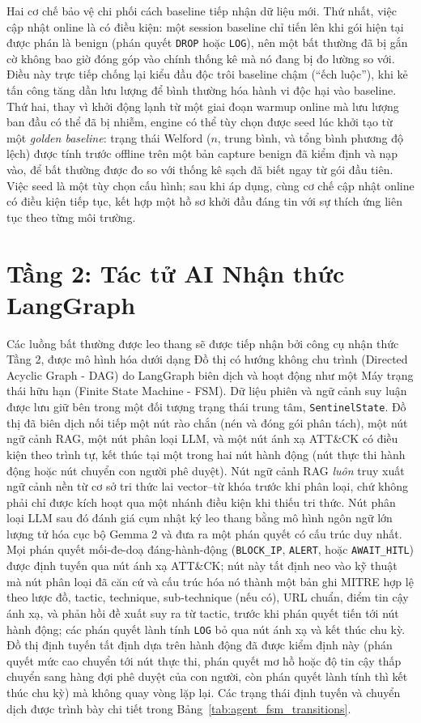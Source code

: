 Hai cơ chế bảo vệ chi phối cách baseline tiếp nhận dữ liệu mới. Thứ nhất, việc cập nhật online là có điều kiện: một session baseline chỉ tiến lên khi gói hiện tại được phán là benign (phán quyết \texttt{DROP} hoặc \texttt{LOG}), nên một bất thường đã bị gắn cờ không bao giờ đóng góp vào chính thống kê mà nó đang bị đo lường so với. Điều này trực tiếp chống lại kiểu đầu độc trôi baseline chậm (``ếch luộc''), khi kẻ tấn công tăng dần lưu lượng để bình thường hóa hành vi độc hại vào baseline. Thứ hai, thay vì khởi động lạnh từ một giai đoạn warmup online mà lưu lượng ban đầu có thể đã bị nhiễm, engine có thể tùy chọn được seed lúc khởi tạo từ một \emph{golden baseline}: trạng thái Welford ($n$, trung bình, và tổng bình phương độ lệch) được tính trước offline trên một bản capture benign đã kiểm định và nạp vào, để bất thường được đo so với thống kê sạch đã biết ngay từ gói đầu tiên. Việc seed là một tùy chọn cấu hình; sau khi áp dụng, cùng cơ chế cập nhật online có điều kiện tiếp tục, kết hợp một hồ sơ khởi đầu đáng tin với sự thích ứng liên tục theo từng môi trường.

\section{Tầng 2: Tác tử AI Nhận thức LangGraph}

Các luồng bất thường được leo thang sẽ được tiếp nhận bởi công cụ nhận thức Tầng 2, được mô hình hóa dưới dạng Đồ thị có hướng không chu trình (Directed Acyclic Graph - DAG) do LangGraph \cite{langgraph2024} biên dịch và hoạt động như một Máy trạng thái hữu hạn (Finite State Machine - FSM). Dữ liệu phiên và ngữ cảnh suy luận được lưu giữ bên trong một đối tượng trạng thái trung tâm, \texttt{SentinelState}. Đồ thị đã biên dịch nối tiếp một nút rào chắn (nén và đóng gói phân tách), một nút ngữ cảnh RAG, một nút phân loại LLM, và một nút ánh xạ ATT\&CK có điều kiện theo trình tự, kết thúc tại một trong hai nút hành động (nút thực thi hành động hoặc nút chuyển con người phê duyệt). Nút ngữ cảnh RAG \emph{luôn} truy xuất ngữ cảnh nền từ cơ sở tri thức lai vector--từ khóa trước khi phân loại, chứ không phải chỉ được kích hoạt qua một nhánh điều kiện khi thiếu tri thức. Nút phân loại LLM sau đó đánh giá cụm nhật ký leo thang bằng mô hình ngôn ngữ lớn lượng tử hóa cục bộ Gemma 2 \cite{gemma_2_2024} và đưa ra một phán quyết có cấu trúc duy nhất. Mọi phán quyết mối-đe-doạ đáng-hành-động (\texttt{BLOCK\_IP}, \texttt{ALERT}, hoặc \texttt{AWAIT\_HITL}) được định tuyến qua nút ánh xạ ATT\&CK; nút này tất định neo vào kỹ thuật mà nút phân loại đã căn cứ và cấu trúc hóa nó thành một bản ghi MITRE hợp lệ theo lược đồ, tactic, technique, sub-technique (nếu có), URL chuẩn, điểm tin cậy ánh xạ, và phản hồi đề xuất suy ra từ tactic, trước khi phán quyết tiến tới nút hành động; các phán quyết lành tính \texttt{LOG} bỏ qua nút ánh xạ và kết thúc chu kỳ. Đồ thị định tuyến tất định dựa trên hành động đã được kiểm định này (phán quyết mức cao chuyển tới nút thực thi, phán quyết mơ hồ hoặc độ tin cậy thấp chuyển sang hàng đợi phê duyệt của con người, còn phán quyết lành tính thì kết thúc chu kỳ) mà không quay vòng lặp lại. Các trạng thái định tuyến và chuyển dịch được trình bày chi tiết trong Bảng~\ref{tab:agent_fsm_transitions}.

